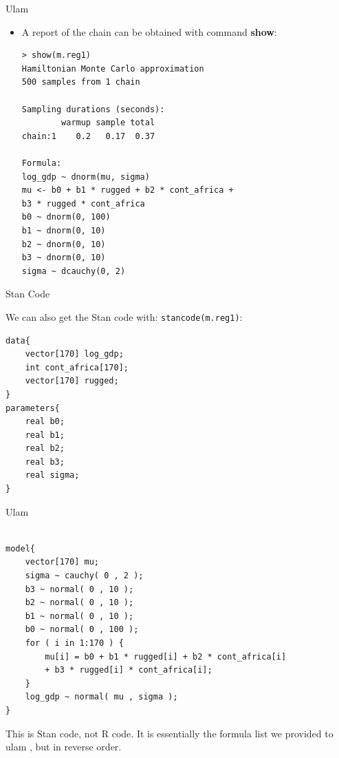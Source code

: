 \documentclass[handout]{beamer}
\begin{document}
\begin{frame}[fragile]{Ulam}
\scriptsize{

\begin{itemize}

\item A report of the chain can be obtained with command \textbf{show}:
\begin{verbatim}
> show(m.reg1)
Hamiltonian Monte Carlo approximation
500 samples from 1 chain

Sampling durations (seconds):
        warmup sample total
chain:1    0.2   0.17  0.37

Formula:
log_gdp ~ dnorm(mu, sigma)
mu <- b0 + b1 * rugged + b2 * cont_africa +
b3 * rugged * cont_africa
b0 ~ dnorm(0, 100)
b1 ~ dnorm(0, 10)
b2 ~ dnorm(0, 10)
b3 ~ dnorm(0, 10)
sigma ~ dcauchy(0, 2) 
\end{verbatim}



 \end{itemize}







} 
\end{frame}

\begin{frame}[fragile]{Stan Code}
\scriptsize{

 We can also get the Stan code with: \verb+stancode(m.reg1)+:  
\begin{verbatim}
data{
    vector[170] log_gdp;
    int cont_africa[170];
    vector[170] rugged;
}
parameters{
    real b0;
    real b1;
    real b2;
    real b3;
    real sigma;
}

\end{verbatim}


} 
\end{frame}


\begin{frame}[fragile]{Ulam}
\scriptsize{

 
\begin{verbatim}

model{
    vector[170] mu;
    sigma ~ cauchy( 0 , 2 );
    b3 ~ normal( 0 , 10 );
    b2 ~ normal( 0 , 10 );
    b1 ~ normal( 0 , 10 );
    b0 ~ normal( 0 , 100 );
    for ( i in 1:170 ) {
        mu[i] = b0 + b1 * rugged[i] + b2 * cont_africa[i] 
        + b3 * rugged[i] * cont_africa[i];
    }
    log_gdp ~ normal( mu , sigma );
}

\end{verbatim}

This is Stan code, not R code. It is essentially the formula list we provided to ulam , but in reverse order.

} 
\end{frame}
\end{document}

